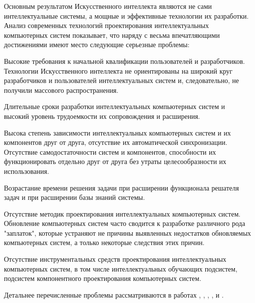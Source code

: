 \begin{partbacktext}
Основным результатом Искусственного интеллекта являются не сами интеллектуальные системы, а мощные и эффективные технологии их разработки. Анализ современных технологий проектирования интеллектуальных компьютерных систем показывает, что наряду с весьма впечатляющими достижениями имеют место следующие серьезные проблемы:
\begin{textitemize}
	\item Высокие требования к начальной квалификации пользователей и разработчиков. Технологии Искусственного интеллекта не ориентированы на широкий круг разработчиков и пользователей интеллектуальных систем и, следовательно, не получили массового распространения.
	\item Длительные сроки разработки интеллектуальных компьютерных систем и высокий уровень трудоемкости их сопровождения и расширения.
	\item Высока степень зависимости интеллектуальных компьютерных систем и их компонентов друг от друга, отсутствие их автоматической синхронизации. Отсутствие самодостаточности систем и компонентов, способности их функционировать отдельно друг от друга без утраты целесообразности их использования.
	\item Возрастание времени решения задачи при расширении функционала решателя задач и при расширении базы знаний системы.
	\item Отсутствие методик проектирования интеллектуальных компьютерных систем. Обновление компьютерных систем часто сводится к разработке различного рода "заплаток"{}, которые устраняют не причины выявленных недостатков обновляемых компьютерных систем, а только некоторые следствия этих причин.
	\item Отсутствие инструментальных средств проектирования интеллектуальных компьютерных систем, в том числе интеллектуальных обучающих подсистем, подсистем компонентного проектирования компьютерных систем.
\end{textitemize}
Детальнее перечисленные проблемы рассматриваются в работах , , , ,  и .


\end{partbacktext}
